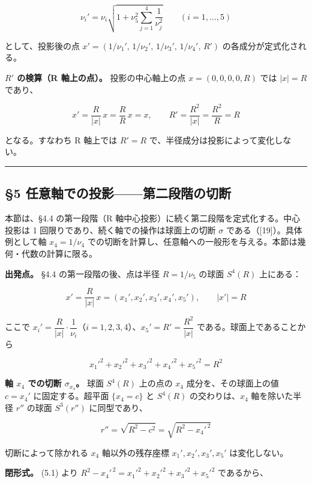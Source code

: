 \documentclass[
]{ltjsarticle}
\begin{document}
\[\nu_i' = \nu_i\sqrt{1+\nu_5^2\sum_{j=1}^{4}\frac{1}{\nu_j^2}}\qquad(i=1,\dots,5)\]

として、投影後の点
\(x'=(1/\nu_1',\,1/\nu_2',\,1/\nu_3',\,1/\nu_4',\,R')\)
の各成分が定式化される。

\textbf{\(R'\) の検算（R 軸上の点）。} 投影の中心軸上の点
\(x=(0,0,0,0,R)\) では \(|x|=R\) であり、

\[x' = \frac{R}{|x|}\,x = \frac{R}{R}\,x = x,\qquad R' = \frac{R^2}{|x|} = \frac{R^2}{R} = R\]

となる。すなわち R 軸上では \(R'=R\)
で、半径成分は投影によって変化しない。

\begin{center}\rule{0.5\linewidth}{0.5pt}\end{center}

\subsection{§5
任意軸での投影------第二段階の切断}\label{ux4efbux610fux8ef8ux3067ux306eux6295ux5f71ux7b2cux4e8cux6bb5ux968eux306eux5207ux65ad}

本節は、§4.4 の第一段階（R
軸中心投影）に続く第二段階を定式化する。中心投影は 1
回限りであり、続く軸での操作は球面上の切断 \(\sigma\)
である（{[}19{]}）。具体例として軸 \(x_4=1/\nu_4\)
での切断を計算し、任意軸への一般形を与える。本節は幾何・代数の計算に限る。

\textbf{出発点。} §4.4 の第一段階の後、点は半径 \(R=1/\nu_5\) の球面
\(S^4(R)\) 上にある：

\[x'=\frac{R}{|x|}\,x=(x_1',x_2',x_3',x_4',x_5'),\qquad |x'|=R\]

ここで
\(x_i'=\dfrac{R}{|x|}\cdot\dfrac{1}{\nu_i}\)（\(i=1,2,3,4\)）、\(x_5'=R'=\dfrac{R^2}{|x|}\)
である。球面上であることから

\[x_1'^2+x_2'^2+x_3'^2+x_4'^2+x_5'^2=R^2 \tag{5.1}\]

\textbf{軸 \(x_4\) での切断 \(\sigma_{x_4}\)。} 球面 \(S^4(R)\) 上の点の
\(x_4\) 成分を、その球面上の値 \(c=x_4'\) に固定する。超平面
\(\{x_4=c\}\) と \(S^4(R)\) の交わりは、\(x_4\) 軸を除いた半径 \(r''\)
の球面 \(S^3(r'')\) に同型であり、

\[r''=\sqrt{R^2-c^2}=\sqrt{R^2-x_4'^{\,2}}\]

切断によって除かれる \(x_4\) 軸以外の残存座標 \(x_1',x_2',x_3',x_5'\)
は変化しない。

\textbf{閉形式。} (5.1) より
\(R^2-x_4'^{\,2}=x_1'^2+x_2'^2+x_3'^2+x_5'^2\) であるから、
\end{document}
